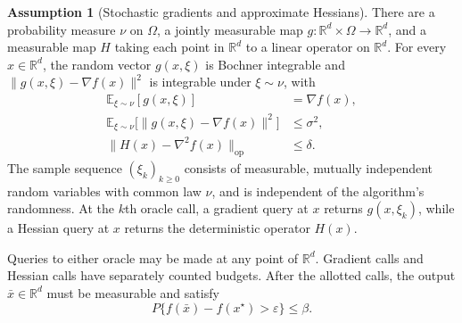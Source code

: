 \documentclass[10pt]{article}
\theoremstyle{definition}
\newtheorem{assumption}{Assumption}
\begin{document}
\begin{assumption}[Stochastic gradients and approximate Hessians]
There are a probability measure $\nu$ on $\Omega$, a jointly measurable map $g:\mathbb{R}^d\times\Omega\to\mathbb{R}^d$, and a measurable map $H$ taking each point in $\mathbb{R}^d$ to a linear operator on $\mathbb{R}^d$. For every $x\in\mathbb{R}^d$, the random vector $g(x,\xi)$ is Bochner integrable and $\|g(x,\xi)-\nabla f(x)\|^2$ is integrable under $\xi\sim\nu$, with
\[
\begin{aligned}
\mathbb{E}_{\xi\sim\nu}[g(x,\xi)]&=\nabla f(x),\\
\mathbb{E}_{\xi\sim\nu}\bigl[\|g(x,\xi)-\nabla f(x)\|^2\bigr]&\leq\sigma^2,\\
\|H(x)-\nabla^2 f(x)\|_{\mathrm{op}}&\leq\delta.
\end{aligned}
\]
The sample sequence $(\xi_k)_{k\geq0}$ consists of measurable, mutually independent random variables with common law $\nu$, and is independent of the algorithm's randomness. At the $k$th oracle call, a gradient query at $x$ returns $g(x,\xi_k)$, while a Hessian query at $x$ returns the deterministic operator $H(x)$.
\end{assumption}

Queries to either oracle may be made at any point of $\mathbb{R}^d$. Gradient calls and Hessian calls have separately counted budgets. After the allotted calls, the output $\bar{x}\in\mathbb{R}^d$ must be measurable and satisfy
\[
P\bigl\{f(\bar{x})-f(x^\star)>\varepsilon\bigr\}\leq\beta.
\]
\end{document}
